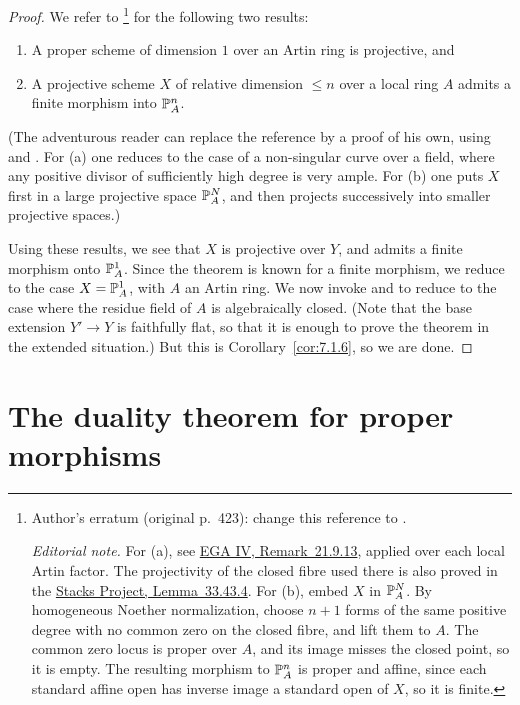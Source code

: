 \begin{proof}
We refer to \cite[\nopp IV,~\S\S22,25]{EGA}\footnote{Author's erratum (original p.~423): change this reference to \cite[\nopp V]{EGA}.\par\emph{Editorial note.} For (a), see \href{https://www.numdam.org/item/PMIHES_1967__32__5_0.pdf\#page=288}{EGA IV, Remark~21.9.13}, applied over each local Artin factor. The projectivity of the closed fibre used there is also proved in the \href{https://stacks.math.columbia.edu/tag/0A26}{Stacks Project, Lemma~33.43.4}. For (b), embed $X$ in $\mathbb{P}_A^N$. By homogeneous Noether normalization, choose $n+1$ forms of the same positive degree with no common zero on the closed fibre, and lift them to $A$. The common zero locus is proper over $A$, and its image misses the closed point, so it is empty. The resulting morphism to $\mathbb{P}_A^n$ is proper and affine, since each standard affine open has inverse image a standard open of $X$, so it is finite.} for the following two results:
\begin{enumerate}
\item[(a)] A proper scheme of dimension $1$ over an Artin ring is projective, and
\item[(b)] A projective scheme $X$ of relative dimension $\le n$ over a local ring $A$ admits a finite morphism into $\mathbb{P}^{n}_{A}$.
\end{enumerate}
(The adventurous reader can replace the reference by a proof of his own, using \cite[\nopp III,~2.6.2]{EGA} and \cite[\nopp III,~4.7.1]{EGA}. For (a) one reduces to the case of a non-singular curve over a field, where any positive divisor of sufficiently high degree is very ample. For (b) one puts $X$ first in a large projective space $\mathbb{P}_{A}^{N}$, and then projects successively into smaller projective spaces.)

Using these results, we see that $X$ is projective over $Y$, and admits a finite morphism onto $\mathbb{P}^{1}_{A}$. Since the theorem is known for a finite morphism, we reduce to the case $X = \mathbb{P}^{1}_{A}$, with $A$ an Artin ring. We now invoke  and  to reduce to the case where the residue field of $A$ is algebraically closed. (Note that the base extension $Y' \to Y$ is faithfully flat, so that it is enough to prove the theorem in the extended situation.) But this is Corollary~\ref{cor:7.1.6}, so we are done.
\end{proof}

\section{The duality theorem for proper morphisms}\label{sec:7.3}

